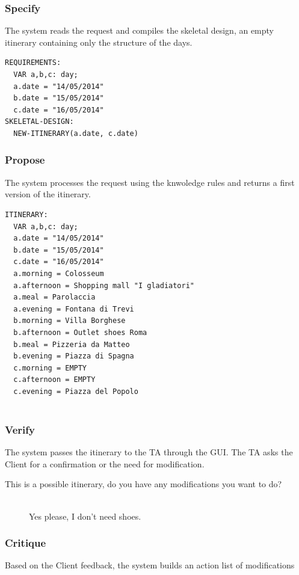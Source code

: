 \documentclass[11pt]{article} %
\begin{document}
\subsubsection{Specify}
The system reads the request and compiles the skeletal design, an empty itinerary containing only the structure of the days.

\begin{lstlisting}[breaklines=true,mathescape=true]
REQUIREMENTS:
  VAR a,b,c: day;
  a.date = "14/05/2014"
  b.date = "15/05/2014"
  c.date = "16/05/2014"
SKELETAL-DESIGN:
  NEW-ITINERARY(a.date, c.date)
\end{lstlisting}

\subsubsection{Propose}
The system processes the request using the knwoledge rules and returns a first version of the itinerary.

\begin{lstlisting}[breaklines=true,mathescape=true]
ITINERARY:
  VAR a,b,c: day;
  a.date = "14/05/2014"
  b.date = "15/05/2014"
  c.date = "16/05/2014"
  a.morning = Colosseum
  a.afternoon = Shopping mall "I gladiatori"
  a.meal = Parolaccia
  a.evening = Fontana di Trevi
  b.morning = Villa Borghese
  b.afternoon = Outlet shoes Roma
  b.meal = Pizzeria da Matteo
  b.evening = Piazza di Spagna
  c.morning = EMPTY
  c.afternoon = EMPTY 
  c.evening = Piazza del Popolo
  
\end{lstlisting}

\subsubsection{Verify}
The system passes the itinerary to the TA through the GUI. The TA asks the Client for a confirmation or the need for modification.

\begin{description}
  \item[This is a possible itinerary, do you have any modifications you want to do?] \hfill \\
  Yes please, I don't need shoes.
\end{description}

\subsubsection{Critique}
Based on the Client feedback, the system builds an action list of modifications
\end{document}
